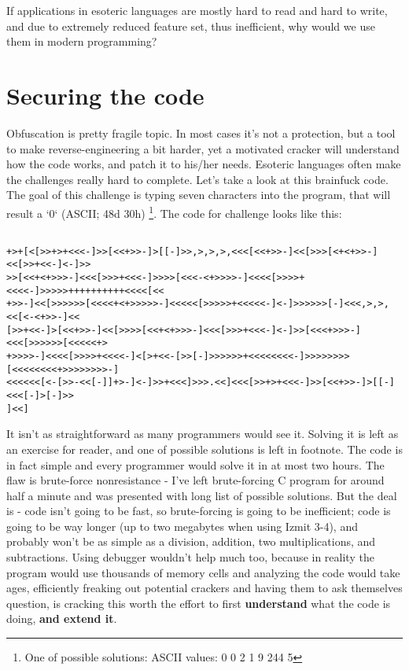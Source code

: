 \documentclass{article}
\begin{document}
\par If applications in esoteric languages are mostly hard to read and hard to write, and due to extremely reduced feature set, thus inefficient, why would we use them in modern programming?

\section{Securing the code}
\par Obfuscation is pretty fragile topic. In most cases it's not a protection, but a tool to make reverse-engineering a bit harder, yet a motivated cracker will understand how the code works, and patch it to his/her needs. Esoteric languages often make the challenges really hard to complete. Let's take a look at this brainfuck code. The goal of this challenge is typing seven characters into the program, that will result a `0` (ASCII; 48d 30h) \footnote{One of possible solutions: ASCII values: 0 0 2 1 9 244 5}. The code for challenge looks like this:

\begin{verbatim}

+>+[<[>>+>+<<<-]>>[<<+>>-]>[[-]>>,>,>,>,<<<[<<+>>-]<<[>>>[<+<+>>-]<<[>>+<<-]<-]>>
>>[<<+<+>>>-]<<<[>>>+<<<-]>>>>[<<<-<+>>>>-]<<<<[>>>>+<<<<-]>>>>>++++++++++<<<<[<<
+>>-]<<[>>>>>>[<<<<+<+>>>>>-]<<<<<[>>>>>+<<<<<-]<-]>>>>>>[-]<<<,>,>,<<[<-<+>>-]<<
[>>+<<-]>[<<+>>-]<<[>>>>[<<+<+>>>-]<<<[>>>+<<<-]<-]>>[<<<+>>>-]<<<[>>>>>>[<<<<<+>
+>>>>-]<<<<[>>>>+<<<<-]<[>+<<-[>>[-]>>>>>>+<<<<<<<<-]>>>>>>>>[<<<<<<<<+>>>>>>>>-]
<<<<<<[<-[>>-<<[-]]+>-]<-]>>+<<<]>>>.<<]<<<[>>+>+<<<-]>>[<<+>>-]>[[-]<<<[-]>[-]>>
]<<]

\end{verbatim}

\par It isn't as straightforward as many programmers would see it. Solving it is left as an exercise for reader, and one of possible solutions is left in footnote. The code is in fact simple and every programmer would solve it in at most two hours. The flaw is brute-force nonresistance - I've left brute-forcing C program for around half a minute and was presented with long list of possible solutions. But the deal is - code isn't going to be fast, so brute-forcing is going to be inefficient; code is going to be way longer (up to two megabytes when using Izmit 3-4), and probably won't be as simple as a division, addition, two multiplications, and subtractions. Using debugger wouldn't help much too, because in reality the program would use thousands of memory cells and analyzing the code would take ages, efficiently freaking out potential crackers and having them to ask themselves question, is cracking this worth the effort to first {\bf understand} what the code is doing, {\bf and extend it}.
\end{document}
